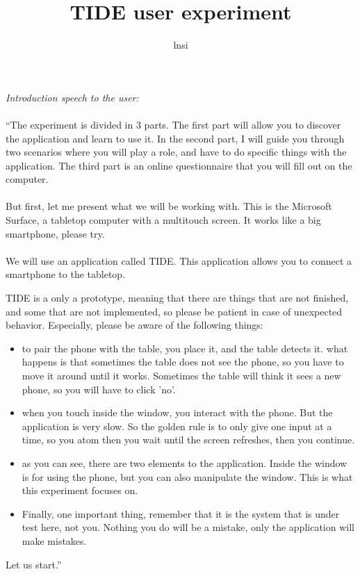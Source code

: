 \documentclass[11pt]{amsart}
\title{TIDE user experiment}
\author{lnsi}
\begin{document}
\maketitle

\emph{Introduction speech to the user:}
\\\\
``The experiment is divided in 3 parts.
The first part will allow you to discover the application and learn to use it.
In the second part, I will guide you through two scenarios where you will play a role, and have to do specific things with the application.
The third part is an online questionnaire that you will fill out on the computer.
\\\\
But first, let me present what we will be working with.
This is the Microsoft Surface, a tabletop computer with a multitouch screen.
It works like a big smartphone, please try.
\\\\
We will use an application called TIDE.
This application allows you to connect a smartphone to the tabletop.

TIDE is a only a prototype, meaning that there are things that are not finished, and some that are not implemented, so please be patient in case of unexpected behavior.
Especially, please be aware of the following things:
\begin{itemize}
\item to pair the phone with the table, you place it, and the table detects it. what happens is that sometimes the table does not see the phone, so you have to move it around until it works. Sometimes the table will think it sees a new phone, so you will have to click 'no'.
\item when you touch inside the window, you interact with the phone. But the application is very slow. So the golden rule is to only give one input at a time, so you atom then you wait until the screen refreshes, then you continue.
\item as you can see, there are two elements to the application. Inside the window is for using the phone, but you can also manipulate the window. This is what this experiment focuses on.
\item Finally, one important thing, remember that it is the system that is under test here, not you. Nothing you do will be a mistake, only the application will make mistakes.
\end{itemize}
Let us start.''

\pagebreak
\end{document}
